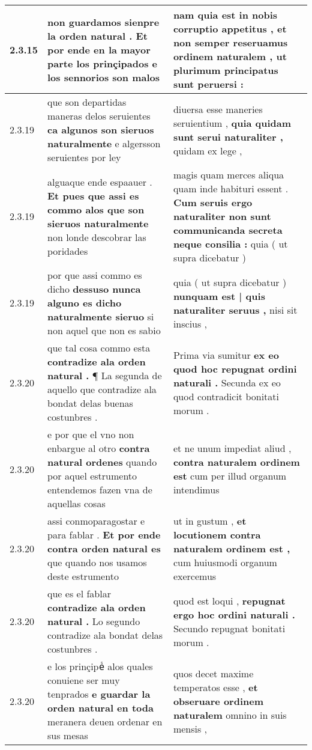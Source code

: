 \begin{tabular}{|p{1cm}|p{6.5cm}|p{6.5cm}|}
2.3.15 & non guardamos \textbf{ sienpre la orden natural . } Et por ende en la mayor parte los prinçipados e los sennorios son malos & nam quia est in nobis corruptio appetitus , \textbf{ et non semper reseruamus ordinem naturalem , } ut plurimum principatus sunt peruersi : \\\hline
2.3.19 & que son departidas maneras delos seruientes \textbf{ ca algunos son sieruos naturalmente } e algersson seruientes por ley & diuersa esse maneries seruientium , \textbf{ quia quidam sunt serui naturaliter , } quidam ex lege , \\\hline
2.3.19 & alguaque ende espaauer . \textbf{ Et pues que assi es commo alos que son sieruos naturalmente } non londe descobrar las poridades & magis quam merces aliqua quam inde habituri essent . \textbf{ Cum seruis ergo naturaliter non sunt communicanda secreta neque consilia : } quia ( ut supra dicebatur ) \\\hline
2.3.19 & por que assi commo es dicho \textbf{ dessuso nunca alguno es dicho naturalmente sieruo } si non aquel que non es sabio & quia ( ut supra dicebatur ) \textbf{ nunquam est | quis naturaliter seruus , } nisi sit inscius , \\\hline
2.3.20 & que tal cosa commo esta \textbf{ contradize ala orden natural . } ¶ La segunda de aquello que contradize ala bondat delas buenas costunbres . & Prima via sumitur \textbf{ ex eo quod hoc repugnat ordini naturali . } Secunda ex eo quod contradicit bonitati morum . \\\hline
2.3.20 & e por que el vno non enbargue al otro \textbf{ contra natural ordenes } quando por aquel estrumento entendemos fazen vna de aquellas cosas & et ne unum impediat aliud , \textbf{ contra naturalem ordinem est } cum per illud organum intendimus \\\hline
2.3.20 & assi conmoparagostar e para fablar . \textbf{ Et por ende contra orden natural es } que quando nos usamos deste estrumento & ut in gustum , \textbf{ et locutionem contra naturalem ordinem est , } cum huiusmodi organum exercemus \\\hline
2.3.20 & que es el fablar \textbf{ contradize ala orden natural . } Lo segundo contradize ala bondat delas costunbres . & quod est loqui , \textbf{ repugnat ergo hoc ordini naturali . } Secundo repugnat bonitati morum . \\\hline
2.3.20 & e los prinçipeᷤ alos quales conuiene ser muy tenprados \textbf{ e guardar la orden natural en toda } meranera deuen ordenar en sus mesas & quos decet maxime temperatos esse , \textbf{ et obseruare ordinem naturalem } omnino in suis mensis , \\\hline

\end{tabular}
